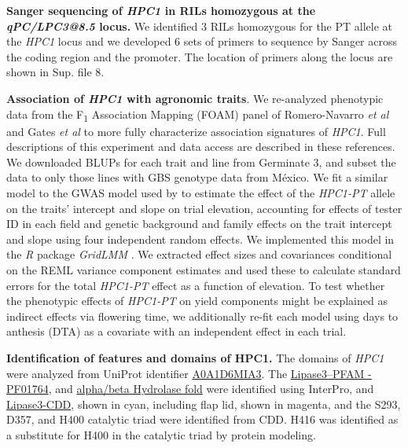 \documentclass[9pt,twocolumn,twoside,lineno]{BioRxiv}
\begin{document}
\textbf{Sanger sequencing of \textit{HPC1} in RILs homozygous at the \textit{qPC/LPC3@8.5} locus.}
We identified 3 RILs homozygous for the PT allele at the \textit{HPC1} locus and we developed 6 sets of primers to sequence by Sanger across the coding region and the promoter. 
The location of primers along the locus are shown in Sup. file 8. 

\textbf{Association of \textit{HPC1} with agronomic traits}.
We re-analyzed phenotypic data from the F\textsubscript{1} Association Mapping (FOAM) panel of Romero-Navarro \textit{et al} \cite{Romero_Navarro2017-cn} and Gates \textit{et al} \cite{Gates2019-xu} to more fully characterize association signatures of \textit{HPC1}. 
Full descriptions of this experiment and data access are described in these references. 
We downloaded BLUPs for each trait and line from Germinate 3, and subset the data to only those lines with GBS genotype data from México. 
We fit a similar model to the GWAS model used by \cite{Gates2019-xu} to estimate the effect of the \textit{HPC1-PT} allele on the traits' intercept and slope on trial elevation, accounting for effects of tester ID in each field and genetic background and family effects on the trait intercept and slope using four independent random effects. 
We implemented this model in the \textit{R} package \textit{GridLMM} \cite{Runcie2019-Gr}. 
We extracted effect sizes and covariances conditional on the REML variance component estimates and used these to calculate standard errors for the total \textit{HPC1-PT} effect as a function of elevation. 
To test whether the phenotypic effects of \textit{HPC1-PT} on yield components might be explained as indirect effects via flowering time, we additionally re-fit each model using days to anthesis (DTA) as a covariate with an independent effect in each trial.

\textbf{Identification of features and domains of HPC1.}
The domains of \textit{HPC1} were analyzed from UniProt identifier \hyperlink{https://www.uniprot.org/uniprot/A0A1D6MIA3}{A0A1D6MIA3}. 
The \hyperlink{https://www.ebi.ac.uk/interpro/entry/pfam/PF01764/}{Lipase3--PFAM - PF01764}, and \hyperlink{https://www.ebi.ac.uk/interpro/entry/InterPro/IPR029058/}{alpha/beta Hydrolase fold} were identified using InterPro, and \hyperlink{https://www.ncbi.nlm.nih.gov/Structure/cdd/cddsrv.cgi?uid=cd00519}{Lipase3-CDD}, shown in cyan, including flap lid, shown in magenta, and the S293, D357, and H400 catalytic triad were identified from CDD. 
H416 was identified as a substitute for H400 in the catalytic triad by protein modeling.
\end{document}

